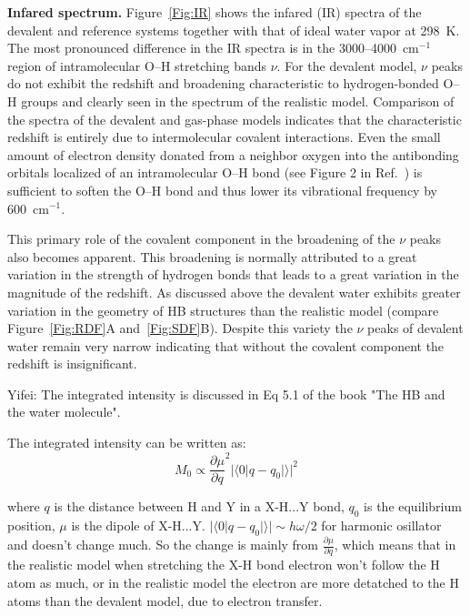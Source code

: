 \documentclass[aps,prl,reprint,amsmath,amssymb]{revtex4-1}
\begin{document}
\textbf{Infared spectrum.} Figure~\ref{Fig:IR} shows the infared (IR) spectra of the devalent and reference systems together with that of ideal water vapor at 298~K. 
The most pronounced difference in the IR spectra is in the 3000--4000~cm$^{-1}$ region of intramolecular O--H stretching bands $\nu$. 
For the devalent model, $\nu$ peaks do not exhibit the redshift and broadening characteristic to hydrogen-bonded O--H groups and clearly seen in the spectrum of the realistic model. 
Comparison of the spectra of the devalent and gas-phase models indicates that the characteristic redshift is entirely due to intermolecular covalent interactions. 
Even the small amount of electron density donated from a neighbor oxygen into the antibonding orbitals localized of an intramolecular O--H bond (see Figure 2 in Ref.~) is sufficient to soften the O--H bond and thus lower its vibrational frequency by 600~cm$^{-1}$.

This primary role of the covalent component in the broadening of the $\nu$ peaks also becomes apparent. 
This broadening is normally attributed to a great variation in the strength of hydrogen bonds that leads to a great variation in the magnitude of the redshift. 
As discussed above the devalent water exhibits greater variation in the geometry of HB structures than the realistic model (compare Figure~\ref{Fig:RDF}A and~\ref{Fig:SDF}B). 
Despite this variety the $\nu$ peaks of devalent water remain very narrow indicating that without the covalent component 
the redshift is insignificant. %



\blue Yifei: The integrated intensity is discussed in Eq 5.1 of the book "The HB and the water molecule".

The integrated intensity can be  written as: 
\[ M_0 \propto \frac{\partial \mu}{\partial q} ^{2} |\langle 0|q-q_0|\rangle|^{2}
\]

where $q$ is the distance between H and Y in a X-H...Y bond, $q_0$ is the equilibrium position, $\mu$ is the dipole of X-H...Y. $|\langle 0|q-q_0|\rangle|\sim h\omega/2$ for harmonic osillator and doesn't change much. So the change is mainly from $\frac{\partial \mu}{\partial q}$, which means that in the realistic model when stretching the X-H bond electron won't follow the H atom as much, or in the realistic model the electron are more detatched to the H atoms than the devalent model, due to electron transfer.
\old
\end{document}
